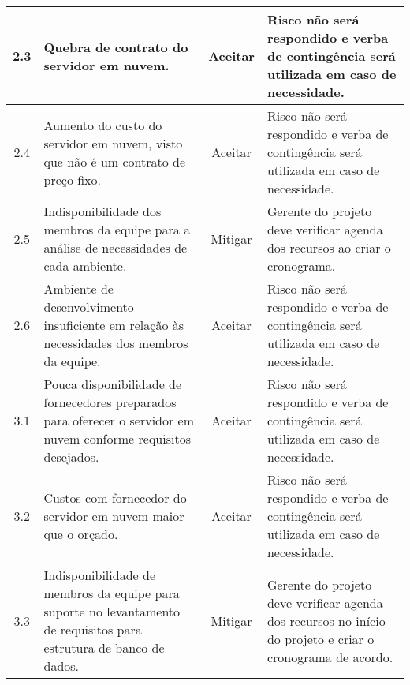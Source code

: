 \begin{longtable}{ c p{} c p{} }
	\midrule
	2.3                      & Quebra de contrato do servidor em nuvem.                                                                                                                                      & Aceitar                    & Risco não será respondido e verba de contingência será utilizada em caso de necessidade.                                           \\
	\midrule
	2.4                      & Aumento do custo do servidor em nuvem, visto que não é um contrato de preço fixo.                                                                                          & Aceitar                    & Risco não será respondido e verba de contingência será utilizada em caso de necessidade.                                           \\
	\midrule
	2.5                      & Indisponibilidade dos membros da equipe para a análise de necessidades de cada ambiente.                                                                                     & Mitigar                    & Gerente do projeto deve verificar agenda dos recursos ao criar o cronograma.                                                           \\
	\midrule
	2.6                      & Ambiente de desenvolvimento insuficiente em relação às necessidades dos membros da equipe.                                                                                 & Aceitar                    & Risco não será respondido e verba de contingência será utilizada em caso de necessidade.                                           \\
	\midrule
	3.1                      & Pouca disponibilidade de fornecedores preparados para oferecer o servidor em nuvem conforme requisitos desejados.                                                             & Aceitar                    & Risco não será respondido e verba de contingência será utilizada em caso de necessidade.                                           \\
	\midrule
	3.2                      & Custos com fornecedor do servidor em nuvem maior que o orçado.                                                                                                               & Aceitar                    & Risco não será respondido e verba de contingência será utilizada em caso de necessidade.                                           \\
	\midrule
	3.3                      & Indisponibilidade de membros da equipe para suporte no levantamento de requisitos para estrutura de banco de dados.                                                           & Mitigar                    & Gerente do projeto deve verificar agenda dos recursos no início do projeto e criar o cronograma de acordo.                            \\

\end{longtable}
